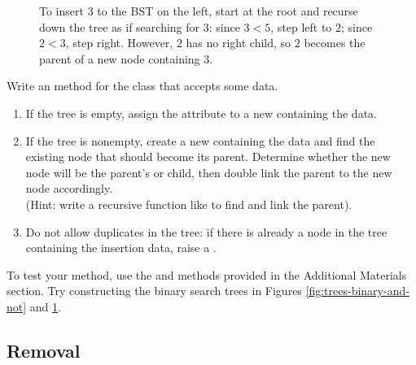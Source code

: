 \begin{figure}[H]
\caption{To insert $3$ to the BST on the left, start at the root and recurse down the tree as if searching for $3$: since $3 < 5$, step left to $2$; since $2 < 3$, step right.
However, $2$ has no right child, so $2$ becomes the parent of a new node containing $3$.
}
\label{fig:BST.insertion}
\end{figure}

\begin{problem} %
\label{prob:bst-insert}
Write an  method for the  class that accepts some data.
\begin{enumerate}
\item If the tree is empty, assign the  attribute to a new  containing the data.
\item If the tree is nonempty, create a new  containing the data and find the existing node that should become its parent.
Determine whether the new node will be the parent's  or  child, then double link the parent to the new node accordingly.
\\(Hint: write a recursive function like  to find and link the parent).
\item Do not allow duplicates in the tree: if there is already a node in the tree containing the insertion data, raise a .
\end{enumerate}
To test your method, use the  and  methods provided in the Additional Materials section.
Try constructing the binary search trees in Figures \ref{fig:trees-binary-and-not} and \ref{fig:BST.insertion}.
\end{problem}

\subsection*{Removal} %

